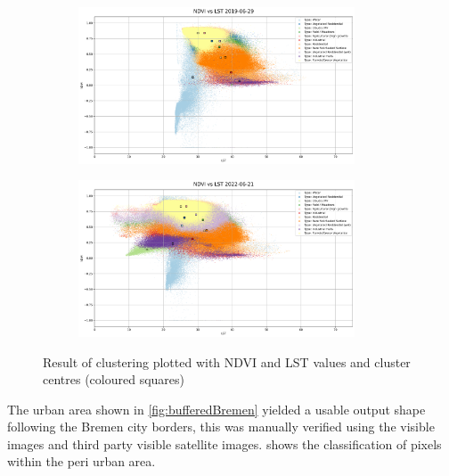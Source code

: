 \documentclass[12pt,a4paper, english,twoside]{scrartcl}
\begin{document}
      \begin{figure}[!htbp]
      \begin{subfigure}[b]{\textwidth}
        \centering
        \includegraphics[width=0.9\textwidth]{img/NDVI vs LST 2019-06-29.png}
        \label{fig:ndvilst01}
      \end{subfigure}
      \begin{subfigure}[b]{\textwidth}
        \centering
        \includegraphics[width=0.9\textwidth]{img/NDVI vs LST 2022-06-21.png}
        \label{fig:ndvilst02}
      \end{subfigure}
      \caption{Result of clustering plotted with \gls{NDVI} and \gls{LST} values and cluster centres (coloured squares)\label{fig:kmeansclusters}}
      \end{figure}
      \noindent
      The urban area shown in \cref{fig:bufferedBremen} yielded a usable output shape following the Bremen city borders, this was manually verified using the visible images and third party visible satellite images. \newpage
      \noindent
       shows the classification of pixels within the peri urban area.
\end{document}
